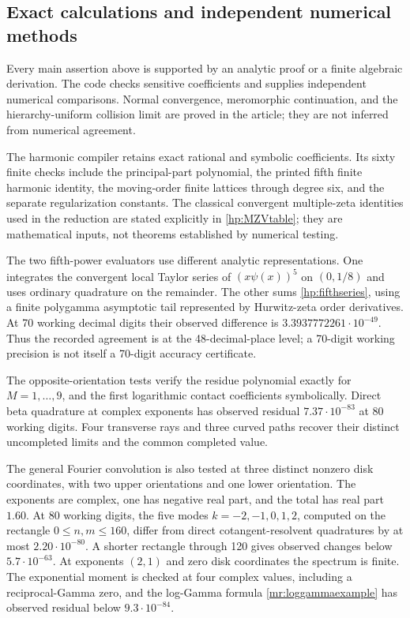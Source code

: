 \documentclass[11pt]{article}
\numberwithin{equation}{section}
\theoremstyle{plain}
\theoremstyle{definition}
\theoremstyle{remark}
\begin{document}
\subsection{Exact calculations and independent numerical methods}

Every main assertion above is supported by an analytic proof or a finite
algebraic derivation. The code checks sensitive coefficients and supplies
independent numerical comparisons. Normal convergence, meromorphic
continuation, and the hierarchy-uniform collision limit are proved in
the article; they are not inferred from numerical agreement.

The harmonic compiler retains exact rational and symbolic coefficients.
Its sixty finite checks include the principal-part polynomial, the
printed fifth finite harmonic identity, the moving-order finite
lattices through degree six, and the separate regularization constants.
The classical convergent multiple-zeta identities used in the reduction
are stated explicitly in \eqref{hp:MZVtable}; they are mathematical
inputs, not theorems established by numerical testing.

The two fifth-power evaluators use different analytic representations.
One integrates the convergent local Taylor series of $(x\psi(x))^5$
on $(0,1/8)$ and uses ordinary quadrature on the remainder.
The other sums \eqref{hp:fifthseries}, using a finite polygamma
asymptotic tail represented by Hurwitz-zeta order derivatives.
At 70 working decimal digits their observed difference is
$3.3937772261\cdot10^{-49}$. Thus the recorded agreement is at the
48-decimal-place level; a 70-digit working precision is not itself
a 70-digit accuracy certificate.

The opposite-orientation tests verify the residue polynomial exactly
for $M=1,\ldots,9$, and the first logarithmic contact coefficients
symbolically. Direct beta quadrature at complex exponents has observed
residual $7.37\cdot10^{-83}$ at 80 working digits. Four transverse
rays and three curved paths recover their distinct uncompleted limits
and the common completed value.

The general Fourier convolution is also tested at three distinct
nonzero disk coordinates, with two upper orientations and one lower
orientation. The exponents are complex, one has negative real part,
and the total has real part $1.60$. At 80 working digits, the five modes
$k=-2,-1,0,1,2$, computed on the rectangle $0\le n,m\le160$, differ
from direct cotangent-resolvent quadratures by at most
$2.20\cdot10^{-80}$. A shorter rectangle through 120 gives observed
changes below $5.7\cdot10^{-63}$.
At exponents $(2,1)$ and zero disk coordinates the spectrum is finite.
The exponential moment is checked at four complex values, including
a reciprocal-Gamma zero, and the log-Gamma formula
\eqref{mr:loggammaexample} has observed residual below
$9.3\cdot10^{-84}$.
\end{document}
